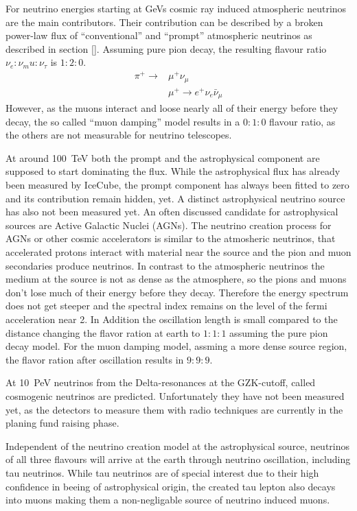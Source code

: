 For neutrino energies starting at GeVs cosmic ray induced atmospheric neutrinos are the main contributors.
Their contribution can be described by a broken power-law flux of \enquote{conventional} and \enquote{prompt} atmospheric neutrinos as described in section \ref{}.
Assuming pure pion decay, the resulting flavour ratio $\nu_e : \nu_mu : \nu_\tau$ is $1:2:0$.
\begin{align}
    \pi^+ \to &\mu^+ \nu_\mu \\
    &\mu^+ \to e^+ \nu_e \bar{\nu}_{\mu}
\end{align}
However, as the muons interact and loose nearly all of their energy before they decay, the so called \enquote{muon damping} model results in a $0:1:0$ flavour ratio, as the others are not measurable for neutrino telescopes.

At around \SI{100}{TeV} both the prompt and the astrophysical component are supposed to start dominating the flux.
While the astrophysical flux has already been measured by IceCube, the prompt component has always been fitted to zero and its contribution remain hidden, yet.
A distinct astrophysical neutrino source has also not been measured yet.
An often discussed candidate for astrophysical sources are Active Galactic Nuclei (AGNs).
The neutrino creation process for AGNs or other cosmic accelerators is similar to the atmosheric neutrinos, that accelerated protons interact with material near the source and the pion and muon secondaries produce neutrinos.
In contrast to the atmospheric neutrinos the medium at the source is not as dense as the atmosphere, so the pions and muons don't lose much of their energy before they decay.
Therefore the energy spectrum does not get steeper and the spectral index remains on the level of the fermi acceleration near 2.
In Addition the oscillation length is small compared to the distance changing the flavor ration at earth to $1:1:1$ assuming the pure pion decay model.
For the muon damping model, assming a more dense source region, the flavor ration after oscillation results in $9:9:9$.

At \SI{10}{PeV} neutrinos from the Delta-resonances at the GZK-cutoff, called cosmogenic neutrinos are predicted.
Unfortunately they have not been measured yet, as the detectors to measure them with radio techniques are currently in the planing fund raising phase.

Independent of the neutrino creation model at the astrophysical source, neutrinos of all three flavours will arrive at the earth through neutrino oscillation, including tau neutrinos.
While tau neutrinos are of special interest due to their high confidence in beeing of astrophysical origin, the created tau lepton also decays into muons making them a non-negligable source of neutrino induced muons.

